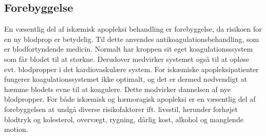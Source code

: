\subsection{Forebyggelse}
En væsentlig del af iskæmisk apopleksi behandling er forebyggelse, da risikoen for en ny blodprop er betydelig. Til dette anvendes antikoagulationsbehandling, som er blodfortyndende medicin. Normalt har kroppen sit eget koagulationsssystem som får blodet til at størkne. Derudover medvirker systemet også til at opløse evt. blodpropper i det kardiovaskulære system. For iskæmiske apopleksipatienter fungerer koagulationssystemet ikke optimalt, og det er dermed nødvendigt at hæmme blodets evne til at koagulere. Dette modvirker dannelsen af nye blodpropper. \cite{Kjaergaard2015}
For både iskæmisk og hæmoragisk apopleksi er en væsentlig del af forebyggelsen at undgå diverse risikofaktorer ift. livsstil, herunder forhøjet blodtryk og kolesterol, overvægt, rygning, dårlig kost, alkohol og manglende motion. \cite{Christensen2015}



%




